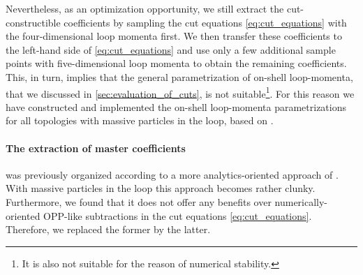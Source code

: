 Nevertheless, as an optimization opportunity,
we still extract the cut-constructible coefficients by sampling 
the cut equations \eqref{eq:cut_equations} 
with the four-dimensional loop momenta first.
We then transfer these coefficients to the left-hand side of \cref{eq:cut_equations} and use only a few additional
sample points with five-dimensional loop momenta to obtain the remaining coefficients.
This, in turn, implies that the general parametrization of on-shell loop-momenta, that we discussed in \cref{sec:evaluation_of_cuts},
is not suitable\footnote{
  It is also not suitable for the reason of numerical stability.
}. For this reason we have constructed and implemented the on-shell loop-momenta parametrizations
for all topologies with massive particles in the loop, based on \cite{Kilgore:2007qr}.



\paragraph{The extraction of master coefficients} was previously organized according to a more analytics-oriented approach of \cite{Forde2007}.
With massive particles in the loop this approach becomes rather clunky.
Furthermore, we found that it does not offer any benefits over numerically-oriented OPP-like subtractions
in the cut equations \eqref{eq:cut_equations}. Therefore, we replaced the former by the latter.


